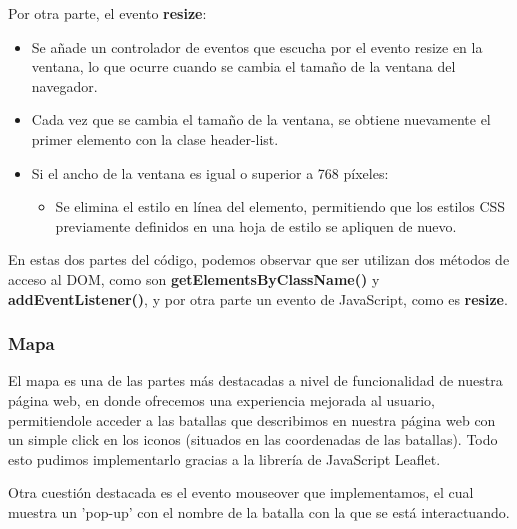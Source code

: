 \documentclass{article}
\begin{document}
Por otra parte, el evento \textbf{resize}:

\begin{itemize}
    \item Se añade un controlador de eventos que escucha por el evento resize en la ventana, lo que ocurre cuando se cambia el tamaño de la ventana del navegador.
    \item Cada vez que se cambia el tamaño de la ventana, se obtiene nuevamente el primer elemento con la clase header-list.
    \item Si el ancho de la ventana es igual o superior a 768 píxeles:
    \begin{itemize}
        \item Se elimina el estilo en línea del elemento, permitiendo que los estilos CSS previamente definidos en una hoja de estilo se apliquen de nuevo.
    \end{itemize}
\end{itemize}

En estas dos partes del código, podemos observar que ser utilizan dos métodos de acceso al DOM, como son \textbf{getElementsByClassName()} y \textbf{addEventListener()}, y por otra parte un evento de JavaScript, como es \textbf{resize}.

\newpage

\subsubsection{Mapa}

El mapa es una de las partes más destacadas a nivel de funcionalidad de nuestra página web, en donde ofrecemos una experiencia mejorada al usuario, permitiendole acceder a las batallas que describimos en nuestra página web con un simple click en los iconos (situados en las coordenadas de las batallas). Todo esto pudimos implementarlo gracias a la librería de JavaScript Leaflet.

Otra cuestión destacada es el evento mouseover que implementamos, el cual muestra un 'pop-up' con el nombre de la batalla con la que se está interactuando.
\end{document}
